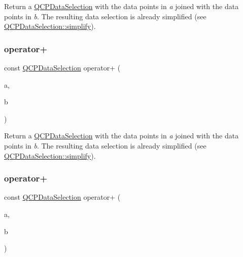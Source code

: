 Return a \hyperlink{class_q_c_p_data_selection}{Q\+C\+P\+Data\+Selection} with the data points in {\itshape a} joined with the data points in {\itshape b}. The resulting data selection is already simplified (see \hyperlink{class_q_c_p_data_selection_a4a2fbad1a6e4d1dd26fdfdf88956f2a4}{Q\+C\+P\+Data\+Selection\+::simplify}). \mbox{\label{class_q_c_p_data_selection_a5feed9419bd3df5cb4d4a761580545cc}} 
\subsubsection{\texorpdfstring{operator+}{operator+}\hspace{0.1cm}{\footnotesize\ttfamily [2/4]}}
{\footnotesize\ttfamily const \hyperlink{class_q_c_p_data_selection}{Q\+C\+P\+Data\+Selection} operator+ (\begin{DoxyParamCaption}\item[{const \hyperlink{class_q_c_p_data_range}{Q\+C\+P\+Data\+Range} \&}]{a,  }\item[{const \hyperlink{class_q_c_p_data_selection}{Q\+C\+P\+Data\+Selection} \&}]{b }\end{DoxyParamCaption})\hspace{0.3cm}{\ttfamily [friend]}}

Return a \hyperlink{class_q_c_p_data_selection}{Q\+C\+P\+Data\+Selection} with the data points in {\itshape a} joined with the data points in {\itshape b}. The resulting data selection is already simplified (see \hyperlink{class_q_c_p_data_selection_a4a2fbad1a6e4d1dd26fdfdf88956f2a4}{Q\+C\+P\+Data\+Selection\+::simplify}). \mbox{\label{class_q_c_p_data_selection_aa574f51a74d6998e9be95e252e6be287}} 
\subsubsection{\texorpdfstring{operator+}{operator+}\hspace{0.1cm}{\footnotesize\ttfamily [3/4]}}
{\footnotesize\ttfamily const \hyperlink{class_q_c_p_data_selection}{Q\+C\+P\+Data\+Selection} operator+ (\begin{DoxyParamCaption}\item[{const \hyperlink{class_q_c_p_data_selection}{Q\+C\+P\+Data\+Selection} \&}]{a,  }\item[{const \hyperlink{class_q_c_p_data_range}{Q\+C\+P\+Data\+Range} \&}]{b }\end{DoxyParamCaption})\hspace{0.3cm}{\ttfamily [friend]}}

